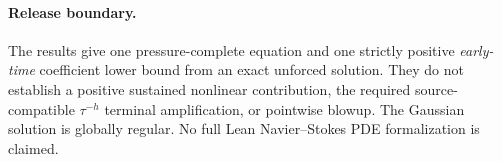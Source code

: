 \paragraph{Release boundary.}
The results give one pressure-complete equation and one
strictly positive \emph{early-time} coefficient lower bound
from an exact unforced solution. They do not establish
a positive sustained nonlinear contribution, the required
source-compatible $\tau^{-h}$ terminal amplification, or
pointwise blowup. The Gaussian solution is globally regular.
No full Lean Navier--Stokes PDE formalization is claimed.
